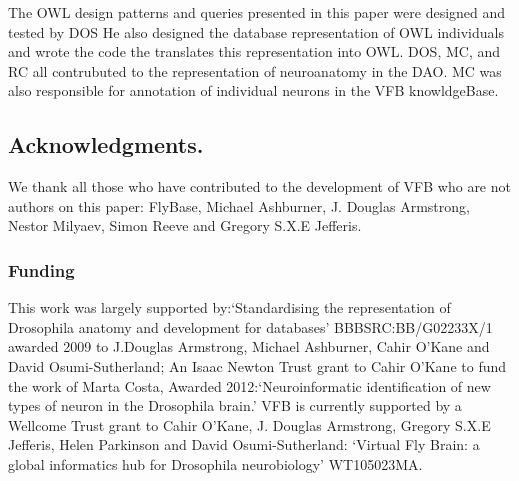 \documentclass[runningheads,a4paper]{llncs}
\begin{document}
The OWL design patterns and queries presented in this paper were designed and
tested by DOS  He also designed the database representation of OWL
individuals and wrote the code the translates this representation into
OWL. DOS, MC, and RC all contrubuted to the representation of
neuroanatomy in the  DAO.  MC  was also responsible for annotation of
individual neurons in the VFB knowldgeBase.

\subsection*{Acknowledgments.}

We thank all those who have contributed to the development of VFB who
are not authors on this paper: FlyBase, Michael Ashburner, J. Douglas
Armstrong, Nestor Milyaev, Simon Reeve and Gregory S.X.E Jefferis.

\subsubsection*{Funding}

This work was largely supported by:`Standardising the representation of
Drosophila anatomy and development for databases' 
BBBSRC:BB/G02233X/1 awarded 2009 to J.Douglas Armstrong, Michael 
Ashburner, Cahir O'Kane and David Osumi-Sutherland;  An Isaac Newton
Trust grant to Cahir O'Kane to fund the work of Marta Costa, Awarded
2012:`Neuroinformatic identification of new types of neuron in the
Drosophila brain.' VFB is currently supported by a Wellcome Trust
grant to Cahir O'Kane, J. Douglas Armstrong, Gregory S.X.E Jefferis,
Helen Parkinson and David Osumi-Sutherland: `Virtual Fly Brain: a
global informatics hub for Drosophila neurobiology' WT105023MA.





\end{document}
